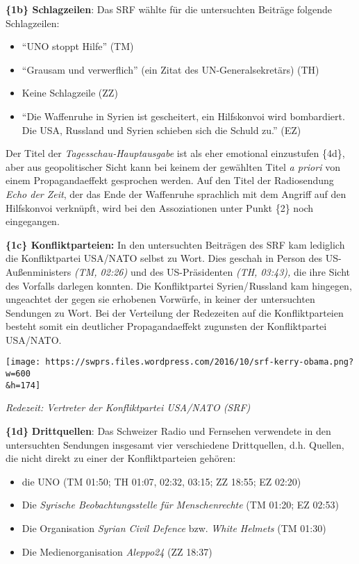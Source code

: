 \textbf{\{1b\} Schlagzeilen}: Das SRF wählte für die untersuchten
Beiträge folgende Schlagzeilen:

\begin{itemize}
\tightlist
\item
  ``UNO stoppt Hilfe'' (TM)
\item
  ``Grausam und verwerflich'' (ein Zitat des UN-Generalsekretärs) (TH)
\item
  Keine Schlagzeile (ZZ)
\item
  ``Die Waffenruhe in Syrien ist gescheitert, ein Hilfskonvoi wird
  bombardiert. Die USA, Russland und Syrien schieben sich die Schuld
  zu.'' (EZ)
\end{itemize}

Der Titel der \emph{Tagesschau-Hauptausgabe} ist als eher emotional
einzustufen \{4d\}, aber aus geopolitischer Sicht kann bei keinem der
gewählten Titel \emph{a priori} von einem Propagandaeffekt gesprochen
werden. Auf den Titel der Radiosendung \emph{Echo der Zeit}, der das
Ende der Waffenruhe sprachlich mit dem Angriff auf den Hilfskonvoi
verknüpft, wird bei den Assoziationen unter Punkt \{2\} noch
eingegangen.

\textbf{\{1c\} Konfliktparteien:} In den untersuchten Beiträgen des SRF
kam lediglich die Konfliktpartei USA/NATO selbst zu Wort. Dies geschah
in Person des US-Außen­ministers \emph{(TM, 02:26)} und des
US-Präsidenten \emph{(TH, 03:43),} die ihre Sicht des Vorfalls darlegen
konnten. Die Konfliktpartei Syrien/ Russland kam hingegen, ungeachtet
der gegen sie erhobenen Vorwürfe, in keiner der untersuchten Sendungen
zu Wort. Bei der Verteilung der Redezeiten auf die Konfliktparteien
besteht somit ein deutlicher Propagandaeffekt zugunsten der
Konfliktpartei USA/NATO.

\texttt{[image: https://swprs.files.wordpress.com/2016/10/srf-kerry-obama.png?w=600\\\&h=174]}

\emph{Redezeit: Vertreter der Konfliktpartei USA/NATO (SRF)}

\textbf{\{1d\}} \textbf{Drittquellen}: Das Schweizer Radio und Fernsehen
verwendete in den untersuchten Sendungen insgesamt vier verschiedene
Dritt­quellen, d.h. Quellen, die nicht direkt zu einer der
Konfliktparteien gehören:

\begin{itemize}
\tightlist
\item
  die UNO (TM 01:50; TH 01:07, 02:32, 03:15; ZZ 18:55; EZ 02:20)
\item
  Die \emph{Syrische Beobachtungsstelle für Menschenrechte} (TM 01:20;
  EZ 02:53)
\item
  Die Organisation \emph{Syrian Civil Defence} bzw. \emph{White Helmets}
  (TM 01:30)
\item
  Die Medienorganisation \emph{Aleppo24} (ZZ 18:37)
\end{itemize}

